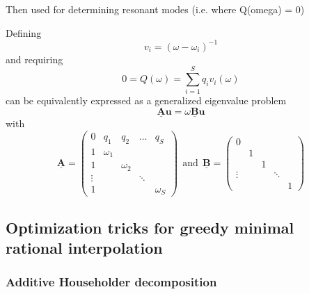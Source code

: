 \documentclass[11pt, a4paper]{article}
\begin{document}
Then used for determining resonant modes (i.e. where Q(omega) = 0)\citep{klein}

Defining 
\begin{equation}
    v_i = (\omega - \omega_i)^{-1}
\end{equation}
and requiring
\begin{equation}
    0 = Q(\omega) = \sum_{i=1}^S q_i v_i(\omega)
\end{equation}
can be equivalently expressed as a generalized eigenvalue problem
\begin{equation}
    \mathbf{\underline{A}} \mathbf{u} = \omega \mathbf{\underline{B}} \mathbf{u}
\end{equation}
with
\begin{equation}
    \mathbf{\underline{A}} = \begin{pmatrix}
        0 & q_1 & q_2 & \dots & q_S \\
        1 & \omega_1 & & & \\
        1 & & \omega_2 & & \\ 
        \vdots & & & \ddots & \\ 
        1 & & & & \omega_S
    \end{pmatrix} ~~\text{and}~~
    \mathbf{\underline{B}} = \begin{pmatrix}
        0 & & & & \\
         & 1 & & & \\
         & & 1 & & \\ 
        \vdots & & & \ddots & \\ 
         & & & & 1
    \end{pmatrix}\label{equ:root-finding}
\end{equation}

\subsection{Optimization tricks for greedy minimal rational interpolation}
\label{subsec:optimization}

\subsubsection{Additive Householder decomposition}
\label{subsubsec:householder}
\end{document}
